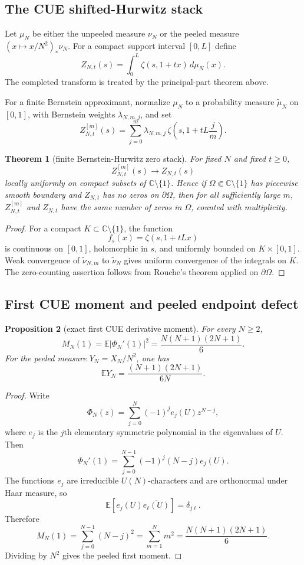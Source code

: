 \documentclass[11pt]{article}
\newtheorem{theorem}{Theorem}[section]
\newtheorem{proposition}[theorem]{Proposition}
\newcommand{\C}{\mathbb C}
\begin{document}
\subsection{The CUE shifted-Hurwitz stack}

Let $\mu_N$ be either the unpeeled measure $\nu_N$ or the peeled measure
$(x\mapsto x/N^2)_*\nu_N$.  For a compact support interval $[0,L]$ define
\[
Z_{N,t}(s)=\int_0^L\zeta(s,1+tx)\,d\mu_N(x).
\]
The completed transform is treated by the principal-part theorem above.

For a finite Bernstein approximant, normalize $\mu_N$ to a probability measure
$\widetilde\mu_N$ on $[0,1]$, with Bernstein weights $\lambda_{N,m,j}$, and set
\[
Z_{N,t}^{[m]}(s)=\sum_{j=0}^m\lambda_{N,m,j}\,
\zeta\left(s,1+tL\frac jm\right).
\]

\begin{theorem}[finite Bernstein-Hurwitz zero stack]
For fixed $N$ and fixed $t\ge0$,
\[
Z_{N,t}^{[m]}(s)\to Z_{N,t}(s)
\]
locally uniformly on compact subsets of $\C\setminus\{1\}$.  Hence if
$\Omega\Subset\C\setminus\{1\}$ has piecewise smooth boundary and $Z_{N,t}$ has no
zeros on $\partial\Omega$, then for all sufficiently large $m$, $Z_{N,t}^{[m]}$ and
$Z_{N,t}$ have the same number of zeros in $\Omega$, counted with multiplicity.
\end{theorem}

\begin{proof}
For a compact $K\subset\C\setminus\{1\}$, the function
\[
f_s(x)=\zeta(s,1+tLx)
\]
is continuous on $[0,1]$, holomorphic in $s$, and uniformly bounded on
$K\times[0,1]$.  Weak convergence of $\widetilde\nu_{N,m}$ to $\widetilde\nu_N$ gives
uniform convergence of the integrals on $K$.  The zero-counting assertion follows from
Rouche's theorem applied on $\partial\Omega$.
\end{proof}

\subsection{First CUE moment and peeled endpoint defect}

\begin{proposition}[exact first CUE derivative moment]
For every $N\ge2$,
\[
M_N(1)=\mathbb E|\Phi_N'(1)|^2=\frac{N(N+1)(2N+1)}6.
\]
For the peeled measure $Y_N=X_N/N^2$, one has
\[
\mathbb E Y_N=\frac{(N+1)(2N+1)}{6N}.
\]
\end{proposition}

\begin{proof}
Write
\[
\Phi_N(z)=\sum_{j=0}^N(-1)^j e_j(U)z^{N-j},
\]
where $e_j$ is the $j$th elementary symmetric polynomial in the eigenvalues of $U$.
Then
\[
\Phi_N'(1)=\sum_{j=0}^{N-1}(-1)^j(N-j)e_j(U).
\]
The functions $e_j$ are irreducible $U(N)$-characters and are orthonormal under Haar
measure, so
\[
\mathbb E[e_j(U)\overline{e_\ell(U)}]=\delta_{j\ell}.
\]
Therefore
\[
M_N(1)=\sum_{j=0}^{N-1}(N-j)^2=\sum_{m=1}^Nm^2=\frac{N(N+1)(2N+1)}6.
\]
Dividing by $N^2$ gives the peeled first moment.
\end{proof}
\end{document}
